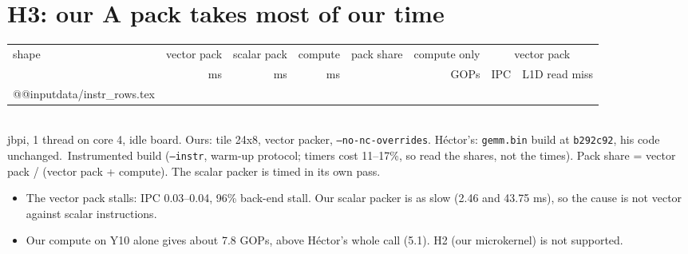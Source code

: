\documentclass[10pt,a4paper]{article}
\newcommand{\D}{data}
\newcommand{\note}[1]{\\[2pt]{\footnotesize\color{muted}#1}}
\newcommand{\onet}{jbpi, 1 thread on core 4, idle board. Ours: tile 24x8, vector packer, \texttt{--no-nc-overrides}. H\'ector's: \texttt{gemm.bin} build at \texttt{b292c92}, his code unchanged.}
\begin{document}
\section{H3: our A pack takes most of our time}
\begin{center}\small\setlength\tabcolsep{4pt}
\begin{tabular}{@{}l rrr r r rr@{}}
\toprule
shape & vector pack & scalar pack & compute & pack share & compute only & \multicolumn{2}{c}{vector pack} \\
 & ms & ms & ms & & GOPs & IPC & L1D read miss \\
\midrule
\csname @@input\endcsname \D/instr_rows.tex
\bottomrule
\end{tabular}
\note{\onet\ Instrumented build (\texttt{--instr}, warm-up protocol; timers cost 11--17\%, so read the shares, not the times). Pack share = vector pack / (vector pack + compute). The scalar packer is timed in its own pass.}
\end{center}
\begin{itemize}\setlength\itemsep{1pt}
\item The vector pack stalls: IPC 0.03--0.04, 96\% back-end stall. Our scalar packer is as slow (2.46 and 43.75 ms), so the cause is not vector against scalar instructions.
\item Our compute on Y10 alone gives about 7.8 GOPs, above H\'ector's whole call (5.1). H2 (our microkernel) is not supported.
\end{itemize}
\end{document}
